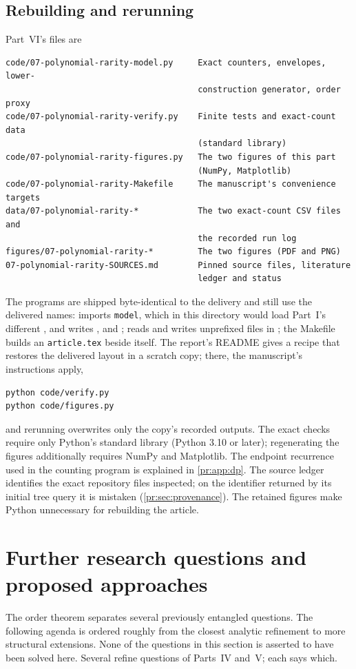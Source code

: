 \documentclass[11pt,a4paper]{article}
\theoremstyle{definition}\newaliascnt{definition}{theorem}
\theoremstyle{remark}\newaliascnt{remark}{theorem}
\begin{document}
\subsection{Rebuilding and rerunning}
\label{pr:sec:reproduce}
Part~VI's files are
\begin{lstlisting}
code/07-polynomial-rarity-model.py     Exact counters, envelopes, lower-
                                       construction generator, order proxy
code/07-polynomial-rarity-verify.py    Finite tests and exact-count data
                                       (standard library)
code/07-polynomial-rarity-figures.py   The two figures of this part
                                       (NumPy, Matplotlib)
code/07-polynomial-rarity-Makefile     The manuscript's convenience targets
data/07-polynomial-rarity-*            The two exact-count CSV files and
                                       the recorded run log
figures/07-polynomial-rarity-*         The two figures (PDF and PNG)
07-polynomial-rarity-SOURCES.md        Pinned source files, literature
                                       ledger and status
\end{lstlisting}
The programs are shipped byte-identical to the delivery and still use the
delivered names:  imports \texttt{model}, which in this
directory would load Part~I's different , and writes
,  and
;  reads
 and writes unprefixed files in
; the Makefile builds an \texttt{article.tex} beside itself.
The report's README gives a recipe that restores the delivered layout in a
scratch copy; there, the manuscript's instructions apply,
\begin{verbatim}
python code/verify.py
python code/figures.py
\end{verbatim}
and rerunning overwrites only the copy's recorded outputs. The exact checks
require only Python's standard library (Python 3.10 or later); regenerating
the figures additionally requires NumPy and Matplotlib. The endpoint
recurrence used in the counting program is explained in \cref{pr:app:dp}.
The source ledger  identifies the
exact repository files inspected; on the identifier returned by its initial
tree query it is mistaken (\cref{pr:sec:provenance}). The retained figures
make Python unnecessary for rebuilding the article.

\section{Further research questions and proposed approaches}
\label{pr:sec:research}
The order theorem separates several previously entangled questions. The
following agenda is ordered roughly from the closest analytic refinement to
more structural extensions. None of the questions in this section is
asserted to have been solved here. Several refine questions of Parts~IV
and~V; each says which.
\end{document}
